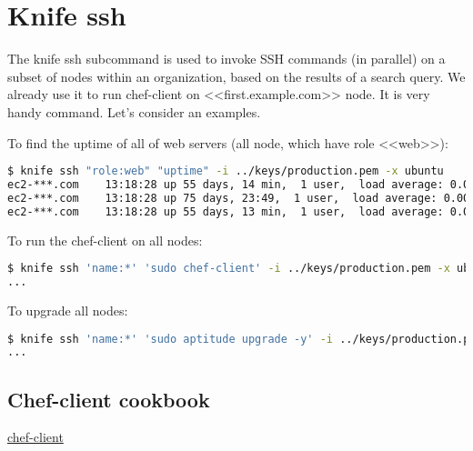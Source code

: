 \section{Knife ssh}

The knife ssh subcommand is used to invoke SSH commands (in parallel) on a subset of nodes within an organization, based on the results of a search query. We already use it to run chef-client on <<first.example.com>> node. It is very handy command. Let's consider an examples.

To find the uptime of all of web servers (all node, which have role <<web>>):

\begin{lstlisting}[language=Bash,label=lst:my-server-cloud-knife-ssh1]
$ knife ssh "role:web" "uptime" -i ../keys/production.pem -x ubuntu
ec2-***.com    13:18:28 up 55 days, 14 min,  1 user,  load average: 0.00, 0.01, 0.05
ec2-***.com    13:18:28 up 75 days, 23:49,  1 user,  load average: 0.00, 0.01, 0.05
ec2-***.com    13:18:28 up 55 days, 13 min,  1 user,  load average: 0.08, 0.03, 0.05
\end{lstlisting}

To run the chef-client on all nodes:

\begin{lstlisting}[language=Bash,label=lst:my-server-cloud-knife-ssh2]
$ knife ssh 'name:*' 'sudo chef-client' -i ../keys/production.pem -x ubuntu
...
\end{lstlisting}

To upgrade all nodes:

\begin{lstlisting}[language=Bash,label=lst:my-server-cloud-knife-ssh3]
$ knife ssh 'name:*' 'sudo aptitude upgrade -y' -i ../keys/production.pem -x ubuntu
...
\end{lstlisting}



\subsection{Chef-client cookbook}

\href{http://community.opscode.com/cookbooks/chef-client}{chef-client}